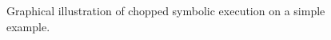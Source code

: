 \begin{figure}[t]
  \centering
  \subfloat[]{
    
    \label{fig:simple-main}
  }
  \hspace{30pt}
  \subfloat[]{
    
    \label{fig:simple-f}
  }
  \hspace{10pt}
  \caption{Graphical illustration of chopped symbolic execution on a simple example.}
  \label{fig:simple}
\end{figure}


